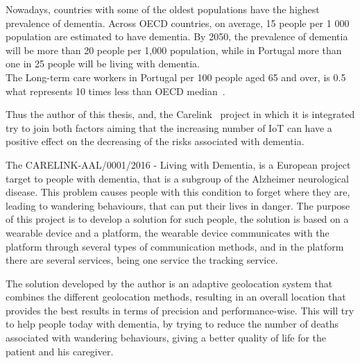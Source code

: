 Nowadays, countries with some of the oldest populations have the highest prevalence of dementia. Across OECD countries, on average, 15 people per 1 000 population are estimated to have dementia. 
By 2050, the prevalence of dementia will be more than 20 people per 1,000 population, while in Portugal more than one in 25 people will be living with dementia.~\cite{oecdcare}
\\The Long-term care workers in Portugal per 100 people aged 65 and over, is  0.5 what represents 10 times less than OECD median~\cite{OECD2019a}.


Thus the author of this thesis, and, the Carelink~\cite{carelink} project in which it is integrated try to join both factors aiming that the increasing number of IoT can have a positive effect on the decreasing of the risks associated with dementia.

The CARELINK-AAL/0001/2016 - Living with Dementia, is a European project target to people with dementia, that is a subgroup of the Alzheimer neurological disease. This problem causes people with this condition to forget where they are, leading to wandering behaviours, that can put their lives in danger.
The purpose of this project is to develop a solution for such people, the solution is based on
a wearable device and a platform, the wearable device communicates with the platform through
several types of communication methods, and in the platform there are several services, being one service the tracking service.

The solution developed by the author is an adaptive geolocation system that combines the different geolocation methods, resulting in an overall location that provides the best results in terms of precision and performance-wise. This will try to help people today with dementia, by trying to reduce the number of deaths associated with wandering behaviours, giving a better quality of life for the patient and his caregiver.







%




%














